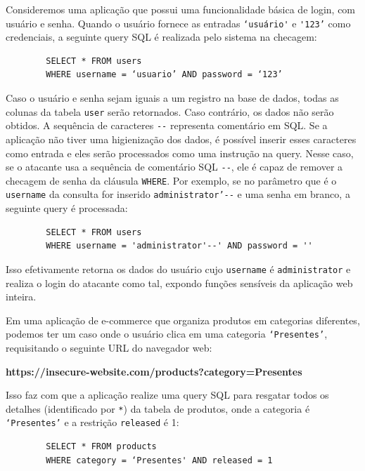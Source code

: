 \begin{alineas}
    \item 
    Consideremos uma aplicação que possui uma funcionalidade básica de login, com usuário e senha. Quando o usuário fornece as entradas \verb+‘usuário'+ e \verb+'123’+ como credenciais, a seguinte query SQL é realizada pelo sistema na checagem:
    
    \begin{verbatim}
        SELECT * FROM users 
        WHERE username = ‘usuario’ AND password = ‘123’
    \end{verbatim}
    
    Caso o usuário e senha sejam iguais a um registro na base de dados, todas as colunas da tabela \verb+user+ serão retornados. Caso contrário, os dados não serão obtidos.
    A sequência de caracteres \verb+--+ representa comentário em SQL. Se a aplicação não tiver uma higienização dos dados, é possível inserir esses caracteres como entrada e eles serão processados como uma instrução na query. Nesse caso, se o atacante usa a sequência de comentário SQL \verb+--+, ele é capaz de remover a checagem de senha da cláusula \verb+WHERE+. Por exemplo, se no parâmetro que é o \verb+username+ da consulta for inserido \verb+administrator’--+ e uma senha em branco, a seguinte query é processada:
    
    \begin{verbatim}
        SELECT * FROM users 
        WHERE username = 'administrator'--' AND password = '' 
    \end{verbatim}
    
    Isso efetivamente retorna os dados do usuário cujo \verb+username+ é \verb+administrator+ e realiza o login do atacante como tal, expondo funções sensíveis da aplicação web inteira.

    \item
    Em uma aplicação de e-commerce que organiza produtos em categorias diferentes, podemos ter um caso onde o usuário clica em uma categoria \verb+‘Presentes’+, requisitando o seguinte URL do navegador web:
    
    \textbf{https://insecure-website.com/products?category=Presentes}
    
    Isso faz com que a aplicação realize uma query SQL para resgatar todos os detalhes (identificado por \verb+*+) da tabela de produtos, onde a categoria é \verb+‘Presentes’+ e a restrição \verb+released+ é 1:
    
    \begin{verbatim}
        SELECT * FROM products
        WHERE category = ‘Presentes' AND released = 1 
    \end{verbatim}
    

\end{alineas}
